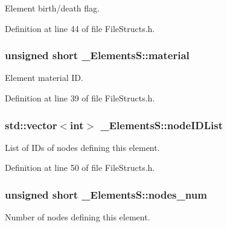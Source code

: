 Element birth/death flag. 



Definition at line 44 of file File\+Structs.\+h.

\subsubsection[{\texorpdfstring{material}{material}}]{\setlength{\rightskip}{0pt plus 5cm}unsigned short \+\_\+\+Elements\+S\+::material}\hypertarget{struct___elements_s_ac64ee48e51f13b1e7aabb9b6a48cb726}{}\label{struct___elements_s_ac64ee48e51f13b1e7aabb9b6a48cb726}


Element material ID. 



Definition at line 39 of file File\+Structs.\+h.

\subsubsection[{\texorpdfstring{node\+I\+D\+List}{nodeIDList}}]{\setlength{\rightskip}{0pt plus 5cm}std\+::vector$<$int$>$ \+\_\+\+Elements\+S\+::node\+I\+D\+List}\hypertarget{struct___elements_s_a9e3631ebed48f8c5869f08f0970c251c}{}\label{struct___elements_s_a9e3631ebed48f8c5869f08f0970c251c}


List of I\+Ds of nodes defining this element. 



Definition at line 50 of file File\+Structs.\+h.

\subsubsection[{\texorpdfstring{nodes\+\_\+num}{nodes_num}}]{\setlength{\rightskip}{0pt plus 5cm}unsigned short \+\_\+\+Elements\+S\+::nodes\+\_\+num}\hypertarget{struct___elements_s_a49bec774408021bd15702208237fb17f}{}\label{struct___elements_s_a49bec774408021bd15702208237fb17f}


Number of nodes defining this element. 



